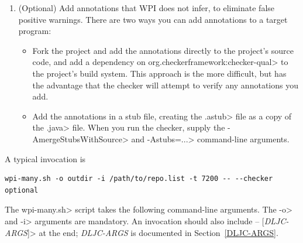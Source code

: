 \begin{enumerate}
\item (Optional) Add annotations that WPI does not infer, to eliminate
  false positive warnings. There are two ways you can add annotations to a target
  program:
  \begin{itemize}
  \item
    Fork the project and add the annotations directly to the project's
    source code, and add a dependency on
    \<org.checkerframework:checker-qual> to the project's build
    system. This approach is the more difficult, but has the advantage that
    the checker will attempt to verify any annotations you add.
  \item Add the annotations in a stub file, creating the \<.astub> file as
    a copy of the \<.java> file.  When you run the checker, supply the
    \<-AmergeStubsWithSource> and \<-Astubs=...> command-line arguments.
  \end{itemize}

\end{enumerate}

A typical invocation is

\begin{Verbatim}
wpi-many.sh -o outdir -i /path/to/repo.list -t 7200 -- --checker optional
\end{Verbatim}

The \<wpi-many.sh> script takes the following command-line arguments.
The \<-o> and \<-i> arguments are mandatory.
An invocation should also include \<-- [\emph{DLJC-ARGS}]> at the end;
\emph{DLJC-ARGS} is documented in Section~\ref{DLJC-ARGS}.


